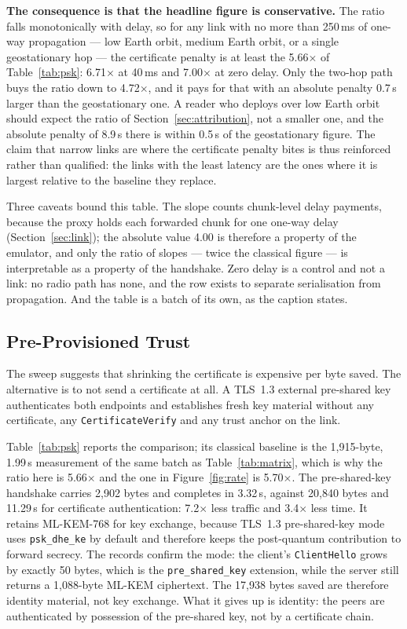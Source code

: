 \documentclass[drones,article,submit,pdftex,moreauthors]{Definitions/mdpi}
\newcommand{\mlkem}{ML-KEM}
\newcommand{\tls}{TLS}
\begin{document}
\textbf{The consequence is that the headline figure is conservative.}
The ratio falls monotonically with delay, so for any link with no more
than 250\,ms of one-way propagation --- low Earth orbit, medium Earth
orbit, or a single geostationary hop --- the certificate penalty is at
least the 5.66$\times$ of Table~\ref{tab:psk}: 6.71$\times$ at 40\,ms
and 7.00$\times$ at zero delay. Only the two-hop path buys the ratio
down to 4.72$\times$, and it pays for that with an absolute penalty
0.7\,s larger than the geostationary one. A reader who deploys over low
Earth orbit should expect the ratio of Section~\ref{sec:attribution},
not a smaller one, and the absolute penalty of 8.9\,s there is within
0.5\,s of the geostationary figure. The claim that narrow links are where the
certificate penalty bites is thus reinforced rather than qualified: the
links with the least latency are the ones where it is largest relative
to the baseline they replace.

Three caveats bound this table. The slope counts chunk-level delay
payments, because the proxy holds each forwarded chunk for one one-way
delay (Section~\ref{sec:link}); the absolute value 4.00 is therefore a
property of the emulator, and only the ratio of slopes --- twice the
classical figure --- is interpretable as a property of the handshake.
Zero delay is a control and not a link: no radio path has none, and the
row exists to separate serialisation from propagation. And the table
is a batch of its own, as the caption states.

\subsection{Pre-Provisioned Trust}
\label{sec:psk}

The sweep suggests that shrinking the certificate is expensive per byte
saved. The alternative is to not send a certificate at all. A
\tls{}~1.3 external pre-shared key authenticates both endpoints and
establishes fresh key material without any certificate, any
\texttt{CertificateVerify} and any trust anchor on the link.

Table~\ref{tab:psk} reports the comparison; its classical baseline is
the 1{,}915-byte, 1.99\,s measurement of the same batch as
Table~\ref{tab:matrix}, which is why the ratio here is 5.66$\times$ and
the one in Figure~\ref{fig:rate} is 5.70$\times$. The pre-shared-key
handshake carries 2{,}902 bytes and completes in 3.32\,s, against
20{,}840 bytes and 11.29\,s for certificate authentication: 7.2$\times$
less traffic and 3.4$\times$ less time. It retains \mlkem{}-768 for key
exchange, because \tls{}~1.3 pre-shared-key mode uses
\texttt{psk\_dhe\_ke} by default and therefore keeps the post-quantum
contribution to forward secrecy. The records confirm the mode: the
client's \texttt{ClientHello} grows by exactly 50 bytes, which is the
\texttt{pre\_shared\_key} extension, while the server still returns a
1{,}088-byte \mlkem{} ciphertext. The 17{,}938 bytes saved are therefore
identity material, not key exchange. What it gives up is identity: the
peers are authenticated by possession of the pre-shared key, not by a
certificate chain.
\end{document}
